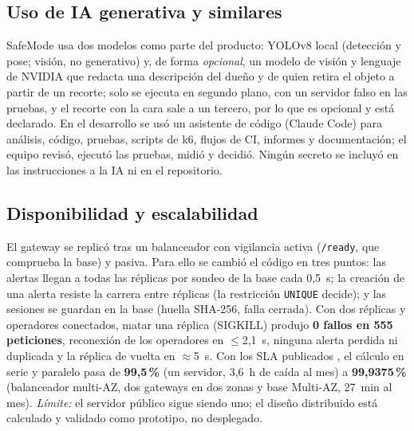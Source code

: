 \documentclass[conference]{IEEEtran}
\begin{document}
\subsection{Uso de IA generativa y similares}
SafeMode usa dos modelos como parte del producto: YOLOv8 local (detección y pose; visión, no generativo) y, de forma \emph{opcional}, un modelo de visión y lenguaje
de NVIDIA que redacta una descripción del dueño y de quien retira el objeto a partir de un recorte; solo se ejecuta en segundo plano, con un servidor falso en las
pruebas, y el recorte con la cara sale a un tercero, por lo que es opcional y está declarado. En el desarrollo se usó un asistente de código (Claude Code) para análisis,
código, pruebas, scripts de k6, flujos de CI, informes y documentación; el equipo revisó, ejecutó las pruebas, midió y decidió. Ningún secreto se incluyó en las
instrucciones a la IA ni en el repositorio.

\subsection{Disponibilidad y escalabilidad}
El gateway se replicó tras un balanceador con vigilancia activa (\texttt{/ready}, que comprueba la base) y pasiva. Para ello se cambió el código en tres puntos: las
alertas llegan a todas las réplicas por sondeo de la base cada 0,5~s; la creación de una alerta resiste la carrera entre réplicas (la restricción \texttt{UNIQUE} decide);
y las sesiones se guardan en la base (huella SHA-256, falla cerrada). Con dos réplicas y operadores conectados, matar una réplica (SIGKILL) produjo \textbf{0 fallos en
555 peticiones}, reconexión de los operadores en $\leq$2,1~s, ninguna alerta perdida ni duplicada y la réplica de vuelta en $\approx$5~s. Con los SLA publicados \cite{aws}, el
cálculo en serie y paralelo pasa de \textbf{99,5\,\%} (un servidor, 3,6~h de caída al mes) a \textbf{99,9375\,\%} (balanceador multi-AZ, dos gateways en dos zonas y base Multi-AZ,
27~min al mes). \emph{Límite:} el servidor público sigue siendo uno; el diseño distribuido está calculado y validado como prototipo, no desplegado.
\end{document}

